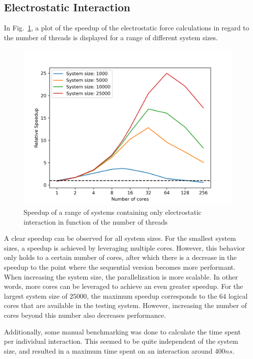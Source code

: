 \documentclass[conference]{IEEEtran}
\begin{document}
    \subsection{Electrostatic Interaction}
    In Fig.~\ref{fig:electro-speedup}, a plot of the speedup of the electrostatic force calculations 
    in regard to the number of threads is displayed for a range of different system sizes.
    \begin{figure}[H]
        \centering
        \includegraphics[width=\linewidth]{./images/electrostatic_scaling.png} %
        \caption{Speedup of a range of systems containing only electrostatic interaction in function of the number 
        of threads}\label{fig:electro-speedup}
    \end{figure}
    A clear speedup can be observed for all system sizes. For the smallest system sizes, a speedup is achieved by leveraging
    multiple cores. However, this behavior only holds to a certain number of cores, after which there is a decrease
    in the speedup to the point where the sequential version becomes more performant. When increasing the system
    size, the parallelization is more scalable. In other words, more cores can be leveraged to achieve an even
    greater speedup. For the largest system size of $25000$, the maximum speedup corresponds to the $64$ logical
    cores that are available in the testing system. However, increasing the number of cores beyond this number
    also decreases performance.

    Additionally, some manual benchmarking was done to calculate the time spent per individual interaction. This
    seemed to be quite independent of the system size, and resulted in a maximum time spent on an interaction 
    around $400 ns$.
\end{document}
